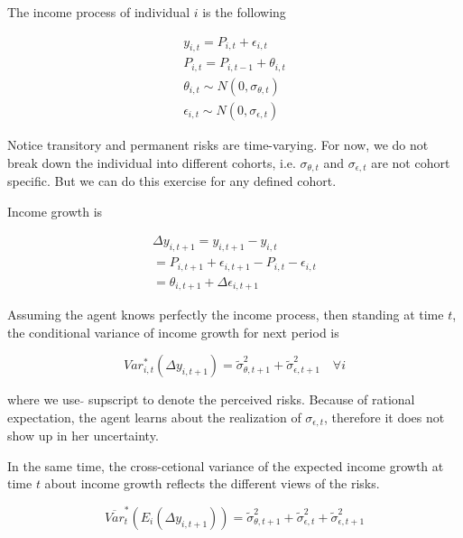 \documentclass[12pt,notitlepage,onecolumn,aps,pra]{revtex4-1}
\begin{document}
The income process of individual \(i\) is the following

\begin{equation}
\begin{split}
y_{i,t} = P_{i,t} + \epsilon_{i,t} \\
P_{i,t} = P_{i,t-1} + \theta_{i,t} \\
\theta_{i,t} \sim N(0,\sigma_{\theta,t}) \\
\epsilon_{i,t} \sim N(0,\sigma_{\epsilon,t})
\end{split}
\end{equation}

Notice transitory and permanent risks are time-varying. For now, we do
not break down the individual into different cohorts, i.e.
\(\sigma_{\theta,t}\) and \(\sigma_{\epsilon,t}\) are not cohort
specific. But we can do this exercise for any defined cohort.

Income growth is

\begin{equation}
\begin{split}
\Delta y_{i,t+1} = y_{i,t+1} - y_{i,t} \\
 = P_{i,t+1} + \epsilon_{i,t+1} - P_{i,t} - \epsilon_{i,t} \\
 = \theta_{i,t+1} + \Delta \epsilon_{i,t+1}
\end{split}
\end{equation}

Assuming the agent knows perfectly the income process, then standing at
time \(t\), the conditional variance of income growth for next period is

\begin{equation}
Var^*_{i,t}(\Delta y_{i,t+1}) = \tilde \sigma^2_{\theta,t+1} + \tilde \sigma^2_{\epsilon,t+1} \quad \forall i
\end{equation}

where we use \(\tilde{}\) supscript to denote the perceived risks.
Because of rational expectation, the agent learns about the realization
of \(\sigma_{\epsilon,t}\), therefore it does not show up in her
uncertainty.

In the same time, the cross-cetional variance of the expected income
growth at time \(t\) about income growth reflects the different views of
the risks.

\begin{equation}
\overline {Var}^*_{t}(E_{i}(\Delta y_{i,t+1})) = \tilde \sigma^2_{\theta,t+1} +\tilde \sigma^2_{\epsilon,t}+ \tilde \sigma^2_{\epsilon,t+1}
\end{equation}
\end{document}
